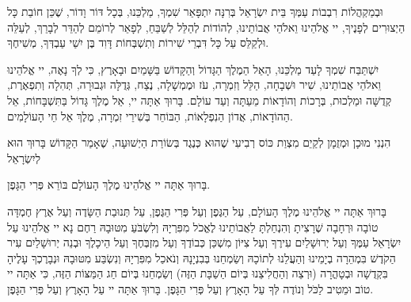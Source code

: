 וּבְמַקְהֲלוֹת רִבְבוֹת עַמְּךָ בֵּית יִשְׂרָאֵל בְּרִנָּה יִתְפָּאֵר שִׁמְךָ, מַלְכֵּנוּ, בְּכָל דּוֹר וָדוֹר, שֶׁכֵּן חוֹבַת כָּל הַיְצוּרִים לְפָנֶיךָ, יי אֱלֹהֵינוּ וֵאלֹהֵי אֲבוֹתֵינוּ, לְהוֹדוֹת לְהַלֵּל לְשַׁבֵּחַ, לְפָאֵר לְרוֹמֵם לְהַדֵּר לְבָרֵךְ, לְעַלֵּה וּלְקַלֵּס עַל כָּל דִּבְרֵי שִׁירוֹת וְתִשְׁבְּחוֹת דָּוִד בֶּן יִשַׁי עַבְדְּךָ, מְשִׁיחֶךָ.

\vspace{1em}

יִשְׁתַּבַּח שִׁמְךָ לָעַד מַלְכֵּנוּ, הָאֵל הַמֶלֶךְ הַגָּדוֹל וְהַקָּדוֹשׁ בַּשָּׁמַיִם וּבָאָרֶץ, כִּי לְךָ נָאֶה, יי אֱלֹהֵינוּ וֵאלֹהֵי אֲבוֹתֵינוּ, שִׁיר וּשְׁבָחָה, הַלֵּל וְזִמְרָה, עֹז וּמֶמְשָׁלָה, נֶצַח, גְּדֻלָּה וּגְבוּרָה, תְּהִלָה וְתִפְאֶרֶת, קְדֻשָּׁה וּמַלְכוּת, בְּרָכוֹת וְהוֹדָאוֹת מֵעַתָּה וְעַד עוֹלָם. בָּרוּךְ אַתָּה יי, אֵל מֶלֶךְ גָּדוֹל בַּתִּשְׁבָּחוֹת, אֵל הַהוֹדָאוֹת, אֲדוֹן הַנִפְלָאוֹת, הַבּוֹחֵר בְּשִׁירֵי זִמְרָה, מֶלֶךְ אֵל חֵי הָעוֹלָמִים.

\vspace{1em}



הִנְנִי מוּכָן וּמְזֻמָן לְקַיֵם מִצְוַת כּוֹס רְבִיעִי שֶׁהוּא כְּנֶגֶד בְּשׂוֹרַת הַיְשׁוּעָה, שֶׁאָמַר הַקָּדוֹשׁ בָּרוּךְ הוּא לְיִשְׂרָאֵל 

בָּרוּךְ אַתָּה יי אֱלֹהֵינוּ מֶלֶךְ הָעוֹלָם בּוֹרֵא פְּרִי הַגָּפֶן.



בָּרוּךְ אַתָּה יי אֱלֹהֵינוּ מֶלֶךְ הָעוֹלָם, עַל הַגֶּפֶן וְעַל פְּרִי הַגֶּפֶן, עַל תְּנוּבַת הַשָּׂדֶה וְעַל אֶרֶץ חֶמְדָּה טוֹבָה וּרְחָבָה שֶׁרָצִיתָ וְהִנְחַלְתָּ לַאֲבוֹתֵינוּ לֶאֱכֹל מִפִּרְיָהּ וְלִשְׂבֹּעַ מִטּוּבָהּ רַחֶם נָא יי אֱלֹהֵינוּ עַל יִשְׂרָאֵל עַמֶּךָ וְעַל יְרוּשָׁלַיִם עִירֶךָ וְעַל צִיּוֹן מִשְׁכַּן כְּבוֹדֶךָ וְעַל מִזְבְּחֶךָ וְעַל הֵיכָלֶךָ וּבְנֵה יְרוּשָׁלַיִם עִיר הַקֹדֶשׁ בִּמְהֵרָה בְיָמֵינוּ וְהַעֲלֵנוּ לְתוֹכָהּ וְשַׂמְחֵנוּ בְּבִנְיָנָהּ וְנֹאכַל מִפִּרְיָהּ וְנִשְׂבַּע מִטּוּבָהּ וּנְבָרֶכְךָ עָלֶיהָ בִּקְדֻשָׁה וּבְטָהֳרָה (וּרְצֵה וְהַחֲלִיצֵנוּ בְּיוֹם הַשַׁבָּת הַזֶּה) וְשַׂמְחֵנוּ בְּיוֹם חַג הַמַּצּוֹת הַזֶּה, כִּי אַתָּה יי טוֹב וּמֵטִיב לַכֹּל וְנוֹדֶה לְּךָ עַל הָאָרֶץ וְעַל פְּרִי הַגָּפֶן. בָּרוּךְ אַתָּה יי עַל הָאָרֶץ וְעַל פְּרִי הַגָּפֶן.

